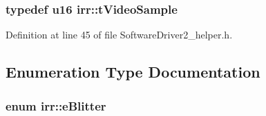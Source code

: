 \hypertarget{namespaceirr_ab51ec14fc2884a414e9fb5a2ca6f03da}{
\subsubsection[{t\-Video\-Sample}]{\setlength{\rightskip}{0pt plus 5cm}typedef u16 {\bf irr\-::t\-Video\-Sample}}}\label{namespaceirr_ab51ec14fc2884a414e9fb5a2ca6f03da}


Definition at line 45 of file Software\-Driver2\-\_\-helper.\-h.



\subsection{Enumeration Type Documentation}
\hypertarget{namespaceirr_aa14849102f59d5f9d3997a77e4ebfc19}{
\subsubsection[{e\-Blitter}]{\setlength{\rightskip}{0pt plus 5cm}enum {\bf irr\-::e\-Blitter}}}\label{namespaceirr_aa14849102f59d5f9d3997a77e4ebfc19}
